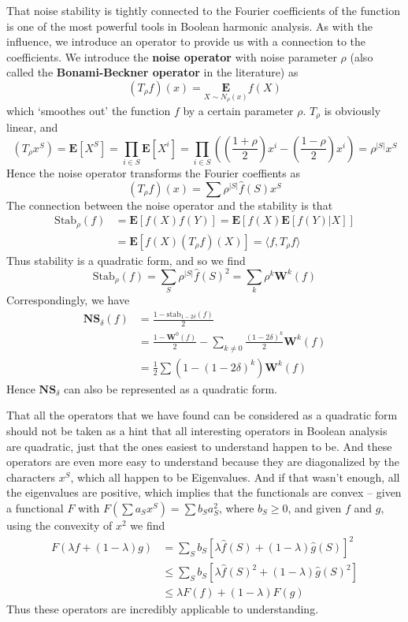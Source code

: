 That noise stability is tightly connected to the Fourier coefficients of the function is one of the most powerful tools in Boolean harmonic analysis. As with the influence, we introduce an operator to provide us with a connection to the coefficients. We introduce the {\bf noise operator} with noise parameter $\rho$ (also called the {\bf Bonami-Beckner operator} in the literature) as
%
\[ (T_\rho f)(x) = \underset{X \sim N_\rho(x)}{\mathbf{E}} f(X) \]
%
which `smoothes out' the function $f$ by a certain parameter $\rho$. $T_\rho$ is obviously linear, and
%
\[ (T_\rho x^S) = \mathbf{E}[X^S] = \prod_{i \in S} \mathbf{E}[X^i] = \prod_{i \in S} \left( \left( \frac{1 + \rho}{2} \right) x^i - \left( \frac{1 - \rho}{2} \right) x^i \right) = \rho^{|S|} x^S \]
%
Hence the noise operator transforms the Fourier coeffients as
%
\[ (T_\rho f)(x) = \sum \rho^{|S|} \widehat{f}(S) x^S \]
%
The connection between the noise operator and the stability is that
%
\begin{align*}
    \text{Stab}_\rho(f) &= \mathbf{E}[f(X)f(Y)] = \mathbf{E}[f(X)\mathbf{E}[f(Y) | X]]\\
    &= \mathbf{E}[f(X) (T_\rho f)(X)] = \langle f, T_\rho f \rangle
\end{align*}
%
Thus stability is a quadratic form, and so we find
%
\[ \text{Stab}_\rho(f) = \sum_S \rho^{|S|} \widehat{f}(S)^2 = \sum_k \rho^k \mathbf{W}^k(f) \]
%
Correspondingly, we have
%
\begin{align*}
    \mathbf{NS}_\delta(f) &= \frac{1 - \text{stab}_{1 - 2\delta}(f)}{2}\\
    &= \frac{1 - \mathbf{W}^0(f)}{2} - \sum_{k \neq 0} \frac{(1 - 2\delta)^k}{2} \mathbf{W}^k(f)\\
    &= \frac{1}{2} \sum (1 - (1 - 2\delta)^k) \mathbf{W}^k(f)
\end{align*}
%
Hence $\mathbf{NS}_\delta$ can also be represented as a quadratic form.

That all the operators that we have found can be considered as a quadratic form should not be taken as a hint that all interesting operators in Boolean analysis are quadratic, just that the ones easiest to understand happen to be. And these operators are even more easy to understand because they are diagonalized by the characters $x^S$, which all happen to be Eigenvalues. And if that wasn't enough, all the eigenvalues are positive, which implies that the functionals are convex -- given a functional $F$ with $F(\sum a_S x^S) = \sum b_S a_S^2$, where $b_S \geq 0$, and given $f$ and $g$, using the convexity of $x^2$ we find
%
\begin{align*}
    F(\lambda f + (1 - \lambda) g) &= \sum_S b_S \left[ \lambda \widehat{f}(S) + (1 - \lambda) \widehat{g}(S) \right]^2\\
    &\leq \sum_S b_S \left[ \lambda \widehat{f}(S)^2 + (1 - \lambda) \widehat{g}(S)^2 \right]\\
    &\leq \lambda F(f) + (1 - \lambda) F(g)
\end{align*}
%
Thus these operators are incredibly applicable to understanding.

